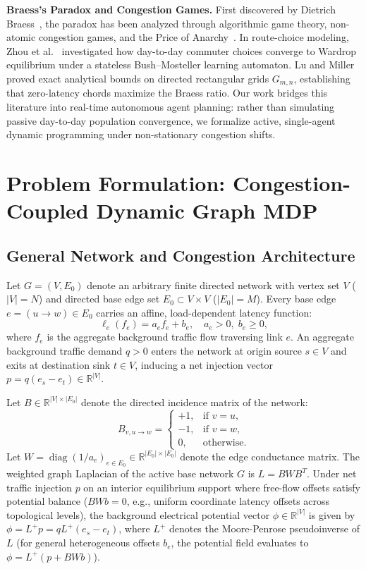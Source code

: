 \documentclass[11pt,a4paper]{article}
\begin{document}
\textbf{Braess's Paradox and Congestion Games.}
First discovered by Dietrich Braess~\cite{braess1968paradoxon}, the paradox has been analyzed through algorithmic game theory, non-atomic congestion games, and the Price of Anarchy~\cite{roughgarden2002bad}. In route-choice modeling, Zhou et al.~\cite{zhou2020reinforcement} investigated how day-to-day commuter choices converge to Wardrop equilibrium under a stateless Bush--Mosteller learning automaton. Lu and Miller~\cite{lu2026braess} proved exact analytical bounds on directed rectangular grids $G_{m,n}$, establishing that zero-latency chords maximize the Braess ratio. Our work bridges this literature into real-time autonomous agent planning: rather than simulating passive day-to-day population convergence, we formalize active, single-agent dynamic programming under non-stationary congestion shifts.

\section{Problem Formulation: Congestion-Coupled Dynamic Graph MDP}
\label{sec:formulation}

\subsection{General Network and Congestion Architecture}
Let $G = (V, E_0)$ denote an arbitrary finite directed network with vertex set $V$ ($|V| = N$) and directed base edge set $E_0 \subset V \times V$ ($|E_0| = M$). Every base edge $e = (u \to w) \in E_0$ carries an affine, load-dependent latency function:
\begin{equation}
\ell_e(f_e) = a_e f_e + b_e, \quad a_e > 0, \; b_e \ge 0,
\end{equation}
where $f_e$ is the aggregate background traffic flow traversing link $e$. An aggregate background traffic demand $q > 0$ enters the network at origin source $s \in V$ and exits at destination sink $t \in V$, inducing a net injection vector $p = q (e_s - e_t) \in \mathbb{R}^{|V|}$.

Let $B \in \mathbb{R}^{|V| \times |E_0|}$ denote the directed incidence matrix of the network:
\begin{equation}
B_{v, u \to w} = 
\begin{cases}
+1, & \text{if } v = u, \\
-1, & \text{if } v = w, \\
0, & \text{otherwise.}
\end{cases}
\end{equation}
Let $W = \operatorname{diag}(1/a_e)_{e \in E_0} \in \mathbb{R}^{|E_0| \times |E_0|}$ denote the edge conductance matrix. The weighted graph Laplacian of the active base network $G$ is $L = B W B^T$. Under net traffic injection $p$ on an interior equilibrium support where free-flow offsets satisfy potential balance ($B W b = 0$, e.g., uniform coordinate latency offsets across topological levels), the background electrical potential vector $\phi \in \mathbb{R}^{|V|}$ is given by $\phi = L^+ p = q L^+ (e_s - e_t)$, where $L^+$ denotes the Moore-Penrose pseudoinverse of $L$ (for general heterogeneous offsets $b_e$, the potential field evaluates to $\phi = L^+(p + B W b)$).
\end{document}
